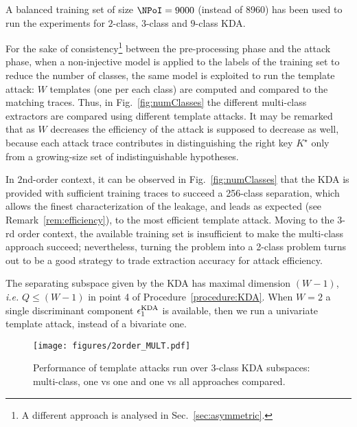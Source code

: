 \begin{remark}
A balanced training set of size $\NPoI=9000$ (instead of 8960) has been used to run the experiments for $2$-class, $3$-class and $9$-class KDA.
\end{remark}

\begin{remark}\label{rem:efficiency}
For the sake of consistency\footnote{A different approach is analysed in Sec.~\ref{sec:asymmetric}.} between the pre-processing phase and the attack phase, when a non-injective model is applied to the labels of the training set to reduce the number of classes, the same model is exploited to run the template attack: $W$ templates (one per each class) are computed and compared to the matching traces. Thus, in Fig.~\ref{fig:numClasses} the different multi-class extractors are compared using different template attacks. It may be remarked that as $W$ decreases the efficiency of the attack is supposed to decrease as well, because each attack trace contributes in distinguishing the right key $K^\star$ only from a growing-size set of indistinguishable hypotheses. 
\end{remark}

In $2$nd-order context, it can be observed in Fig.~\ref{fig:numClasses} that the KDA is provided with sufficient training traces to succeed a 256-class separation, which allows the finest characterization of the leakage, and leads as expected (see Remark~\ref{rem:efficiency}), to the most efficient template attack. Moving to the $3$-rd order context, the available training set is insufficient to make the multi-class approach succeed; nevertheless, turning the problem into a 2-class problem turns out to be a good strategy to trade extraction accuracy for attack efficiency.



\begin{remark}\label{rem:numComp}
The separating subspace given by the KDA has maximal dimension $(W-1)$, \emph{i.e.} $Q\leq (W-1)$ in point 4 of Procedure~\ref{procedure:KDA}. When $W=2$ a single discriminant component $\epsilon^{\mathrm{KDA}}_1$ is available, then we run a univariate template attack, instead of a bivariate one. 
\end{remark}


\begin{figure}
\centering
\texttt{[image: figures/2order\_MULT.pdf]}
\caption{Performance of template attacks run over 3-class KDA subspaces: multi-class, one vs one and one vs all approaches compared.}\label{fig:3multi-class}
\end{figure}

